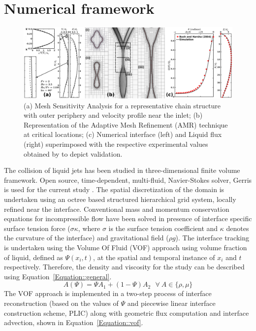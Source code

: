 \documentclass{jfm}
\begin{document}
\section{Numerical framework}
\begin{figure}
	\centering
	\includegraphics[width=\linewidth]{Figure2}
	\caption{(a) Mesh Sensitivity Analysis for a representative chain structure with outer periphery and velocity profile near the inlet; (b) Representation of the Adaptive Mesh Refinement (AMR) technique at critical locations; (c) Numerical interface (left) and Liquid flux (right) superimposed with the respective experimental values obtained by \cite{bush2004collision} to depict validation.}
	\label{Figure::gisetal}
\end{figure}
The collision of liquid jets has been studied in three-dimensional finite volume framework. Open source, time-dependent, multi-fluid, Navier-Stokes solver, Gerris is used for the current study \citep{Popinet2003}. The spatial discretization of the domain is undertaken using an octree based structured hierarchical grid system, locally refined near the interface. Conventional mass and momentum conservation equations for incompressible flow have been solved in presence of interface specific surface tension force ($\sigma \kappa$, where $\sigma$ is the surface tension coefficient and $\kappa$ denotes the curvature of the interface) and gravitational field ($\rho g$). The interface tracking is undertaken using the Volume Of Fluid (VOF) approach using volume fraction of liquid, defined as $\Psi(x_i, t)$, at the spatial and temporal instance of $x_i$ and $t$ respectively. Therefore, the density and viscosity for the study can be described using Equation~\ref{Equation::general}.
\begin{equation} \label{Equation::general}
A (\Psi) = \Psi A_1 + (1-\Psi)A_2 \: \: \:  \forall  \: A \in \{\rho, \mu\}
\end{equation}
The VOF approach is implemented in a two-step process of interface reconstruction (based on the values of $\Psi$ and piecewise linear interface construction scheme, PLIC) along with geometric flux computation and interface advection, shown in Equation~\ref{Equation::vof}.
\end{document}
